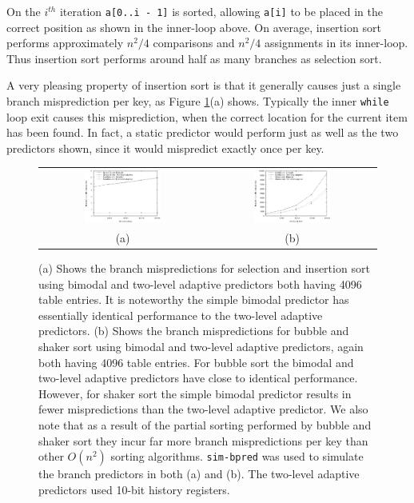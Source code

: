 \documentclass[acmtocl]{acmtrans2m}
\begin{document}
On the $i^{th}$ iteration \texttt{a[0..i - 1]} is sorted, allowing \texttt{a[i]}
to be placed in the correct position as shown in the inner-loop above. On
average, insertion sort performs approximately $n^2/4$ comparisons and $n^2/4$
assignments in its inner-loop. Thus insertion sort performs around half as many
branches as selection sort.

A very pleasing property of insertion sort is that it generally causes just a
single branch misprediction per key, as Figure \ref{elementary_sorts}(a) shows.
Typically the inner \texttt{while} loop exit causes this misprediction, when the
correct location for the current item has been found.  In fact, a static
predictor would perform just as well as the two predictors shown, since it would
mispredict exactly once per key.

\begin{figure}
\centering
\begin{tabular}{cc}
\includegraphics[width=0.48\textwidth]{plots/selection_insertion_sort_branches.eps} & \includegraphics[width=0.48\textwidth]{plots/bubble_shaker_sort_branches.eps} \\
(a) & (b) \\
\end{tabular}
\caption{(a) Shows the branch mispredictions for selection and insertion sort
using bimodal and two-level adaptive predictors both having 4096 table entries.
It is noteworthy the simple bimodal predictor has essentially identical
performance to the two-level adaptive predictors. (b) Shows the branch
mispredictions for bubble and shaker sort using bimodal and two-level adaptive
predictors, again both having 4096 table entries. For bubble sort the bimodal
and two-level adaptive predictors have close to identical performance. However,
for shaker sort the simple bimodal predictor results in fewer mispredictions
than the two-level adaptive predictor. We also note that as a result of the
partial sorting performed by bubble and shaker sort they incur far more branch
mispredictions per key than other $O(n^2)$ sorting algorithms.
\texttt{sim-bpred} was used to simulate the branch predictors in both (a) and
(b). The two-level adaptive predictors used 10-bit history registers.}
\label{elementary_sorts}
\end{figure}
\end{document}
